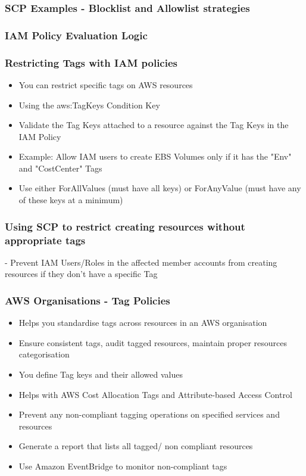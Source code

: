 \subsubsection{SCP Examples - Blocklist and Allowlist strategies}

\subsubsection{IAM Policy Evaluation Logic}

\subsubsection{Restricting Tags with IAM policies}
\begin{itemize}
    \item You can restrict specific tags on AWS resources
    \item Using the aws:TagKeys Condition Key
    \item Validate the Tag Keys attached to a resource against the Tag Keys in the IAM Policy
    \item Example: Allow IAM users to create EBS Volumes only if it has the "Env" and "CostCenter" Tags
    \item Use either ForAllValues (must have all keys) or ForAnyValue (must have any of these keys at a minimum)
\end{itemize}


\subsubsection{Using SCP to restrict creating resources without appropriate tags}
- Prevent IAM Users/Roles in the affected member accounts from creating resources if they don't have a specific Tag

\subsubsection{AWS Organisations - Tag Policies}
\begin{itemize}
    \item Helps you standardise tags across resources in an AWS organisation
    \item Ensure consistent tags, audit tagged resources, maintain proper resources categorisation
    \item You define Tag keys and their allowed values
    \item Helps with AWS Cost Allocation Tags and Attribute-based Access Control
    \item Prevent any non-compliant tagging operations on specified services and resources
    \item Generate a report that lists all tagged/ non compliant resources
    \item Use Amazon EventBridge to monitor non-compliant tags
\end{itemize}

